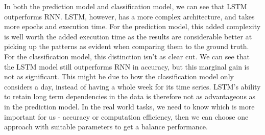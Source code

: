 \documentclass[a4paper, article, oneside, USenglish, IN5460]{memoir}
\begin{document}
In both the prediction model and classification model, we can see that LSTM outperforms RNN. LSTM, however, has a more complex architecture, and takes more epochs and execution time. For the prediction model, this added complexity is well worth the added execution time as the results are considerable better at picking up the patterns as evident when comparing them to the ground truth. For the classification model, this distinction isn't as clear cut. We can see that the LSTM model still outperforms RNN in accuracy, but this marginal gain is not as significant. This might be due to how the classification model only considers a day, instead of having a whole week for its time series. LSTM's ability to retain long term dependencies in the data is therefore not as advantageous as in the prediction model. In the real world tasks, we need to know which is more important for us - accuracy or computation efficiency, then we can choose one approach with suitable parameters to get a balance performance.



\nocite{tensorflow2015-whitepaper}
\nocite{dataset}

\printbibliography{}

\vspace*{10mm}
\end{document}
